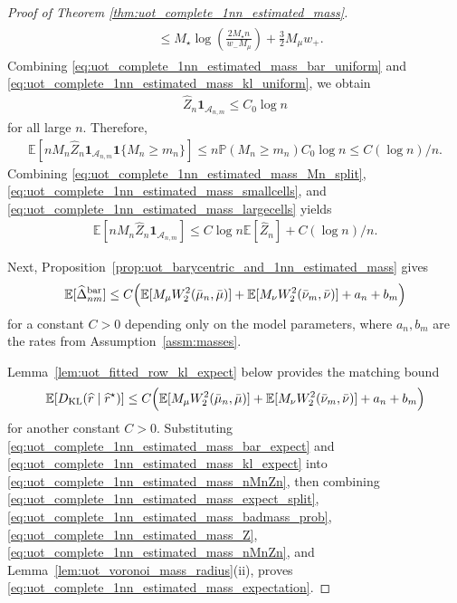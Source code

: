 \documentclass[11pt,reqno]{amsart}
\theoremstyle{definition}
\newcommand{\KL}{\mathrm{KL}}
\renewcommand{\hat}{\widehat}
\newcommand{\Ep}{\mathbb{E}}
\begin{document}
\begin{proof}[Proof of Theorem \ref{thm:uot_complete_1nn_estimated_mass}]
\begin{align}
\begin{aligned}
    &\le
    M_\star \log\left(\frac{2M_\star n}{w_-M_\mu}\right)
    + \frac{3}{2}M_\mu w_+.
\end{aligned}
\end{align}
Combining \eqref{eq:uot_complete_1nn_estimated_mass_bar_uniform} and
\eqref{eq:uot_complete_1nn_estimated_mass_kl_uniform}, we obtain
\begin{align}
    \hat Z_n\mathbf{1}_{\mathcal{A}_{n,m}}
    \le
    C_0\log n
\end{align}
for all large $n$.
Therefore,
\begin{align}
\label{eq:uot_complete_1nn_estimated_mass_largecells}
    \Ep[nM_n \hat Z_n \mathbf{1}_{\mathcal{A}_{n,m}}\mathbf{1}\{M_n\ge m_n\}]
    \le
    n \mathbb{P}(M_n\ge m_n) C_0\log n
    \le
    C{(\log n)/n}.
\end{align}
Combining \eqref{eq:uot_complete_1nn_estimated_mass_Mn_split},
\eqref{eq:uot_complete_1nn_estimated_mass_smallcells}, and
\eqref{eq:uot_complete_1nn_estimated_mass_largecells} yields
\begin{align}
\label{eq:uot_complete_1nn_estimated_mass_nMnZn}
    \Ep[nM_n \hat Z_n \mathbf{1}_{\mathcal{A}_{n,m}}]
    \le
    C\log n \Ep[\hat Z_n] + C{(\log n)/n}.
\end{align}

Next, Proposition~\ref{prop:uot_barycentric_and_1nn_estimated_mass} gives
\begin{align}
\label{eq:uot_complete_1nn_estimated_mass_bar_expect}
    \Ep[\hat\Delta_{nm}^{\mathrm{bar}}]
    \le
    C
    \Bigl(
        \Ep[M_\mu W_2^2(\bar\mu_n,\bar\mu)]
        +
        \Ep[M_\nu W_2^2(\bar\nu_m,\bar\nu)]
        + a_n + b_m
    \Bigr)
\end{align}
for a constant $C>0$ depending only on the model parameters, where $a_n,b_m$ are the rates from Assumption~\ref{assm:masses}.


Lemma~\ref{lem:uot_fitted_row_kl_expect} below provides the matching bound
\begin{align}
\label{eq:uot_complete_1nn_estimated_mass_kl_expect}
    \Ep[{D_\KL}(\hat r\mid \hat r^\star)]
    \le
    C
    \Bigl(
        \Ep[M_\mu W_2^2(\bar\mu_n,\bar\mu)]
        +
        \Ep[M_\nu W_2^2(\bar\nu_m,\bar\nu)]
        + a_n + b_m
    \Bigr)
\end{align}
for another constant $C>0$.
Substituting \eqref{eq:uot_complete_1nn_estimated_mass_bar_expect} and
\eqref{eq:uot_complete_1nn_estimated_mass_kl_expect} into
\eqref{eq:uot_complete_1nn_estimated_mass_nMnZn}, then combining
\eqref{eq:uot_complete_1nn_estimated_mass_expect_split},
\eqref{eq:uot_complete_1nn_estimated_mass_badmass_prob},
\eqref{eq:uot_complete_1nn_estimated_mass_Z},
\eqref{eq:uot_complete_1nn_estimated_mass_nMnZn}, and
Lemma~\ref{lem:uot_voronoi_mass_radius}(ii), proves
\eqref{eq:uot_complete_1nn_estimated_mass_expectation}.
\end{proof}
\end{document}
